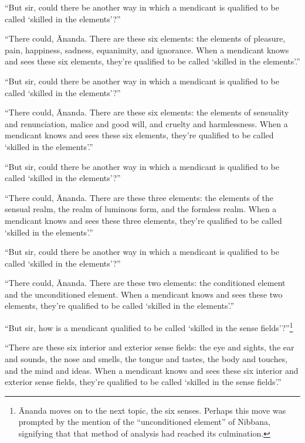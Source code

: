 \documentclass[12pt,openany]{book}%
\begin{document}
“But sir, could there be another way in which a mendicant is qualified to be called ‘skilled in the elements’?” 

“There could, Ānanda. There are these six elements: the elements of pleasure, pain, happiness, sadness, equanimity, and ignorance. When a mendicant knows and sees these six elements, they’re qualified to be called ‘skilled in the elements’.” 

“But sir, could there be another way in which a mendicant is qualified to be called ‘skilled in the elements’?” 

“There could, Ānanda. There are these six elements: the elements of sensuality and renunciation, malice and good will, and cruelty and harmlessness. When a mendicant knows and sees these six elements, they’re qualified to be called ‘skilled in the elements’.” 

“But sir, could there be another way in which a mendicant is qualified to be called ‘skilled in the elements’?” 

“There could, Ānanda. There are these three elements: the elements of the sensual realm, the realm of luminous form, and the formless realm. When a mendicant knows and sees these three elements, they’re qualified to be called ‘skilled in the elements’.” 

“But sir, could there be another way in which a mendicant is qualified to be called ‘skilled in the elements’?” 

“There could, Ānanda. There are these two elements: the conditioned element and the unconditioned element. When a mendicant knows and sees these two elements, they’re qualified to be called ‘skilled in the elements’.” 

“But sir, how is a mendicant qualified to be called ‘skilled in the sense fields’?”\footnote{Ānanda moves on to the next topic, the six senses. Perhaps this move was prompted by the mention of the “unconditioned element” of Nibbana, signifying that that method of analysis had reached its culmination. } 

“There are these six interior and exterior sense fields: the eye and sights, the ear and sounds, the nose and smells, the tongue and tastes, the body and touches, and the mind and ideas. When a mendicant knows and sees these six interior and exterior sense fields, they’re qualified to be called ‘skilled in the sense fields’.” 
\end{document}
